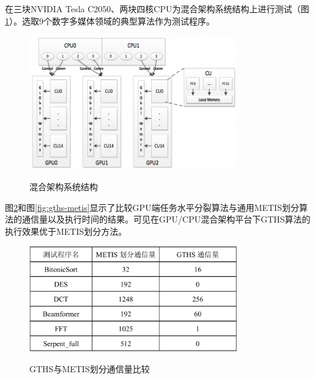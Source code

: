 在三块NVIDIA Tesla C2050、两块四核CPU为混合架构系统结构上进行测试（图\ref{fig:fusion}）。选取9个数字多媒体领域的典型算法作为测试程序。

\begin{figure}[htbp]
  \centering
  \includegraphics[width=0.8\textwidth]{Img/Chap_Application/Yu/fusion.png}\\
  \caption{混合架构系统结构}\label{fig:fusion}
\end{figure}

图\ref{fig:gm-commu}和图\ref{fig:gths-metis}显示了比较GPU端任务水平分裂算法与通用METIS划分算法的通信量以及执行时间的结果。可见在GPU/CPU混合架构平台下GTHS算法的执行效果优于METIS划分方法。

\begin{figure}[htbp]
  \centering
  \includegraphics[width=0.8\textwidth]{Img/Chap_Application/Yu/gths-metis-commu.png}\\
  \caption{GTHS与METIS划分通信量比较}\label{fig:gm-commu}
\end{figure}

